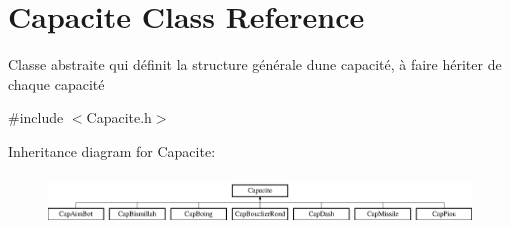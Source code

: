 \hypertarget{class_capacite}{}\section{Capacite Class Reference}
\label{class_capacite}


Classe abstraite qui définit la structure générale d\textquotesingle{}une capacité, à faire hériter de chaque capacité  




{\ttfamily \#include $<$Capacite.\+h$>$}

Inheritance diagram for Capacite\+:\begin{figure}[H]
\begin{center}
\leavevmode
\includegraphics[height=1.344538cm]{class_capacite}
\end{center}
\end{figure}
